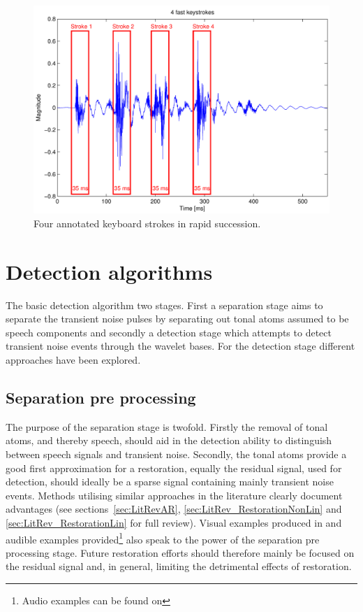 \begin{figure}[!] %
\centering
\includegraphics[width=120mm]{Keyboard4StrokesFast.pdf}
\caption{Four annotated keyboard strokes in rapid succession.}\label{fig:Keyboard4StrokesFast}
\end{figure}

\section{Detection algorithms}\label{sec:WPdetection}
The basic detection algorithm \DIFdelbegin {}\DIFdelend \DIFaddbegin {}\DIFaddend two stages. First a separation stage aims to separate the transient noise pulses by separating out tonal atoms assumed to be speech components and secondly a detection stage which attempts to detect transient noise events through the wavelet bases. For the detection stage\DIFaddbegin \DIFadd{, } different approaches have been explored.

\subsection{Separation pre processing}\label{sec:WPseparation}
The purpose of the separation stage is twofold. Firstly the removal of tonal atoms, and thereby speech, should aid in the detection \DIFdelbegin {}\DIFdelend \DIFaddbegin {}\DIFaddend ability to distinguish between speech signals and transient noise. Secondly, the tonal atoms provide a good first approximation for a restoration, equally the residual signal, used for detection, should ideally be a sparse signal containing mainly transient noise events. Methods utilising similar approaches in the literature clearly document \DIFdelbegin {}\DIFdelend \DIFaddbegin {}\DIFaddend advantages \cite{Godsill1998book} (see sections~\ref{sec:LitRevAR}, \ref{sec:LitRev_RestorationNonLin} and \ref{sec:LitRev_RestorationLin} for full review). Visual examples produced in \DIFdelbegin {}\DIFdelend \DIFaddbegin {}\DIFaddend and audible examples provided\footnote{Audio examples can be found on \siteURL} also speak to the power of the separation pre processing stage.
Future restoration efforts should therefore mainly be focused on the residual signal and, in general, limiting the detrimental effects of restoration.

